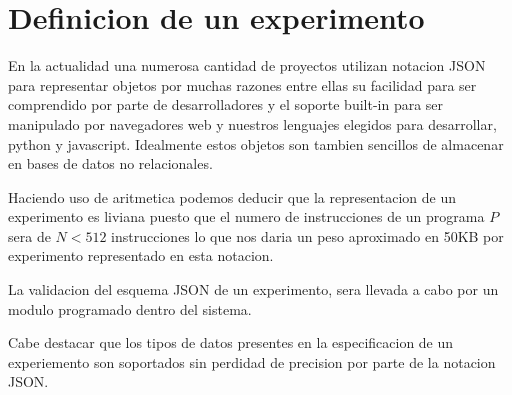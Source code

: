 \section{Definicion de un experimento}

En la actualidad una numerosa cantidad de proyectos utilizan notacion JSON para representar
objetos por muchas razones entre ellas su facilidad para ser comprendido por parte de desarrolladores
y el soporte built-in para ser manipulado por navegadores web y nuestros lenguajes elegidos para
desarrollar, python y javascript. Idealmente estos objetos son tambien sencillos de almacenar en 
bases de datos no relacionales.

Haciendo uso de aritmetica podemos deducir que la representacion de un experimento
es liviana puesto que el numero de instrucciones de un programa \(P\) sera de \(N < 512 \) instrucciones
lo que nos daria un peso aproximado en 50KB por experimento representado en esta notacion.

La validacion del esquema JSON de un experimento, sera llevada a cabo por un modulo programado
dentro del sistema. 

Cabe destacar que los tipos de datos presentes en la especificacion de un experiemento son
soportados sin perdidad de precision por parte de la notacion JSON.\cite{json_ref}

\newpage

